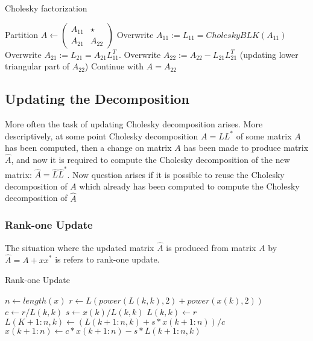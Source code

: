 \begin{algorithm}[h]
  \caption{Cholesky factorization}\label{cholesky_blk}
  \begin{algorithmic}[1]
     \State Partition $A \gets
	\left(
\begin{array}{c|c}
A_{11}  & \star \\ \hline
A_{21} & A_{22}
\end{array}
\right)$
	\State Overwrite $A_{11}:=L_{11} = CholeskyBLK({A_{11}})$
	\State Overwrite $A_{21} :=L_21 = A_{21}L_{11}^T$.
	\State Overwrite $A_{22}:=A_{22}-L_{21}L_{21}^T$ (updating lower triangular part of $A_22$)
	\State Continue with $A=A_{22}$
    \EndProcedure
  \end{algorithmic}
\end{algorithm}

\subsection*{Updating the Decomposition}
More often the task of updating Cholesky decomposition arises. More descriptively, at some point Cholesky decomposition $A=LL^*$ of some matrix $A$ has been computed, then a change on matrix $A$ has been made to produce matrix $\hat{A}$, and now it is required to compute the Cholesky decomposition of the new matrix: $\hat{A}=\hat{L}\hat{L}^*$. Now question arises if it is possible to reuse the Cholesky decomposition of $A$ which already has been computed to compute the Cholesky decomposition of $\hat{A}$
\subsubsection*{Rank-one Update}
The situation where the updated matrix $\hat{A}$ is produced from matrix $A$ by $\hat{A}=A+xx^*$ is refers to rank-one update. 
\begin{algorithm}[h]
  \caption{Rank-one Update}\label{cholesky_rank_update}
  \begin{algorithmic}[1]
     \State $n\gets length(x)$
     	\State $r\gets L(power(L(k,k),2)+power(x(k),2))$
     	\State $c\gets r/L(k,k)$
     	\State $s\gets x(k)/L(k,k)$
     	\State $L(k,k)\gets r$
     	\State $L(K+1:n,k)\gets (L(k+1:n,k)+s*x(k+1:n))/c$
     	\State $x(k+1:n) \gets c*x(k+1:n) - s*L(k+1:n,k)$
     \EndFor    
    \EndProcedure
  \end{algorithmic}
\end{algorithm}

